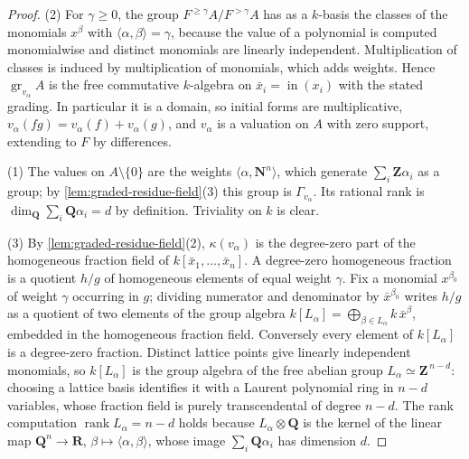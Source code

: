 \begin{proof}
(2) For $\gamma\geq0$, the group
$F^{\geq\gamma}A/F^{>\gamma}A$ has as a $k$-basis the classes of the
monomials $x^\beta$ with $\langle\alpha,\beta\rangle=\gamma$, because the
value of a polynomial is computed monomialwise and distinct monomials are
linearly independent. Multiplication of classes is induced by
multiplication of monomials, which adds weights. Hence
$\operatorname{gr}_{v_\alpha}A$ is the free commutative $k$-algebra on
$\bar x_i=\operatorname{in}(x_i)$ with the stated grading. In particular
it is a domain, so initial forms are multiplicative,
$v_\alpha(fg)=v_\alpha(f)+v_\alpha(g)$, and $v_\alpha$ is a valuation on
$A$ with zero support, extending to $F$ by differences.

(1) The values on $A\setminus\{0\}$ are the weights
$\langle\alpha,\mathbf N^n\rangle$, which generate
$\sum_i\mathbf Z\alpha_i$ as a group; by
\cref{lem:graded-residue-field}(3) this group is $\Gamma_{v_\alpha}$. Its
rational rank is $\dim_{\mathbf Q}\sum_i\mathbf Q\alpha_i=d$ by
definition. Triviality on $k$ is clear.

(3) By \cref{lem:graded-residue-field}(2), $\kappa(v_\alpha)$ is the
degree-zero part of the homogeneous fraction field of
$k[\bar x_1,\ldots,\bar x_n]$. A degree-zero homogeneous fraction is a
quotient $h/g$ of homogeneous elements of equal weight $\gamma$. Fix a
monomial $x^{\beta_0}$ of weight $\gamma$ occurring in $g$; dividing
numerator and denominator by $\bar x^{\beta_0}$ writes $h/g$ as a
quotient of two elements of the group algebra
$k[L_\alpha]
=\bigoplus_{\beta\in L_\alpha}k\,\bar x^{\beta}$, embedded in the
homogeneous fraction field. Conversely every element of
$k[L_\alpha]$ is a degree-zero fraction. Distinct lattice points give
linearly independent monomials, so
$k[L_\alpha]$ is the group algebra of the free abelian group
$L_\alpha\simeq\mathbf Z^{\,n-d}$: choosing a lattice basis identifies it
with a Laurent polynomial ring in $n-d$ variables, whose fraction field
is purely transcendental of degree $n-d$. The rank computation
$\operatorname{rank}L_\alpha=n-d$ holds because
$L_\alpha\otimes\mathbf Q$ is the kernel of the linear map
$\mathbf Q^n\to\mathbf R$, $\beta\mapsto\langle\alpha,\beta\rangle$,
whose image $\sum_i\mathbf Q\alpha_i$ has dimension $d$.


\end{proof}
